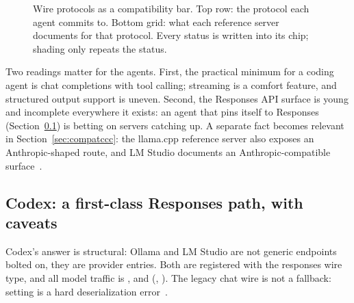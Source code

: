 \documentclass{article}
\newcommand{\codex}[0]{Codex}
\begin{document}
\begin{figure}[t]
\caption{Wire protocols as a compatibility bar. Top row: the protocol each
agent commits to. Bottom grid: what each reference server documents for
that protocol. Every status is written into its chip; shading only
repeats the status.}
\label{fig:protocolbar}
\end{figure}

Two readings matter for the agents. First, the practical minimum for a
coding agent is chat completions with tool calling; streaming is a
comfort feature, and structured output support is uneven. Second, the
Responses API surface is young and incomplete everywhere it exists: an
agent that pins itself to Responses (Section~\ref{sec:compatcodex}) is
betting on servers catching up. A separate fact becomes relevant in
Section~\ref{sec:compatccc}: the llama.cpp reference server also exposes
an Anthropic-shaped  route, and LM Studio documents an
Anthropic-compatible surface~\citep{llamaCppServerDocs,lmstudioApiDocs}.

\subsection{Codex: a first-class Responses path, with caveats}
\label{sec:compatcodex}

\codex{}'s answer is structural: Ollama and LM Studio are not generic
endpoints bolted on, they are provider entries. Both are registered with
the responses wire type, and all model traffic is
, 
and 
(,
). The
legacy chat wire is not a fallback: setting  is a
hard deserialization error~\citep{codexRepo}.
\end{document}
